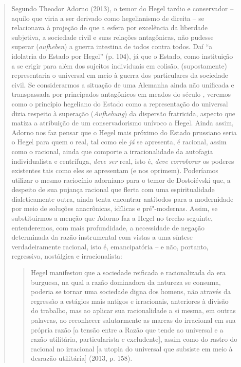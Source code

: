 {\begin{quote}
Segundo Theodor Adorno (2013), o temor do Hegel tardio e conservador --
aquilo que viria a ser derivado como hegelianismo de direita -- se
relacionava à projeção de que a esfera por excelência da liberdade
subjetiva, a sociedade civil e suas relações antagônicas, não pudesse
superar (\emph{aufheben}) a guerra intestina de todos contra todos. Daí
``a idolatria do Estado por Hegel'' (p. 104), já que o Estado, como
instituição a se erigir para além dos sujeitos individuais em colisão,
(supostamente) representaria o universal em meio à guerra dos
particulares da sociedade civil. Se considerarmos a situação de uma
Alemanha ainda não unificada e transpassada por principados antagônicos
em meados do século , veremos como o princípio hegeliano do Estado
como a representação do universal dizia respeito à superação
(\emph{Aufhebung}) da dispersão fratricida, aspecto que matiza a
atribuição de um conservadorismo unívoco a Hegel. Ainda assim, Adorno
nos faz pensar que o Hegel mais próximo do Estado prussiano seria o
Hegel para quem o real, tal como ele \emph{já} se apresenta, é racional,
assim como o racional, ainda que comporte a irracionalidade da autofagia
individualista e centrífuga, \emph{deve ser} real, isto é, \emph{deve
corroborar} os poderes existentes tais como eles se apresentam (e nos
oprimem). Poderíamos utilizar o mesmo raciocínio adorniano para o temor
de Dostoiévski que, a despeito de sua pujança racional que flerta com
uma espiritualidade dialeticamente outra, ainda tenta encontrar
antítodos para a modernidade por meio de soluções anacrônicas, idílicas
e pré"-modernas. Assim, se substituirmos a menção que Adorno faz a Hegel
no trecho seguinte, entenderemos, com mais profundidade, a necessidade
de negação determinada da razão instrumental com vistas a uma síntese
verdadeiramente racional, isto é, emancipatória -- e não, portanto,
regressiva, nostálgica e irracionalista:

\begin{quote}
Hegel manifestou que a sociedade reificada e racionalizada da era
burguesa, na qual a razão dominadora da natureza se consuma, poderia se
tornar uma sociedade digna dos homens, não através da regressão a
estágios mais antigos e irracionais, anteriores à divisão do trabalho,
mas ao aplicar sua racionalidade a si mesma, em outras palavras, ao
reconhecer salutarmente as marcas do irracional em sua própria razão
{[}a tensão entre a Razão que tende ao universal e a razão utilitária,
particularista e excludente{]}, assim como do rastro do racional no
irracional {[}a utopia do universal que subsiste em meio à desrazão
utilitária{]} (2013, p. 158).
\end{quote}


\end{quote}}

